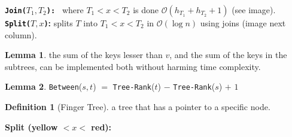 \documentclass[]{article}
\theoremstyle{definition}
\newtheorem{Definition}{\color{defiColor}Definition}
\newtheorem{Lemma}{\color{lemColor}Lemma}
\newcommand\lem   [1] {\begin{Lemma}#1\end{Lemma}}
\newcommand\oc    {\mathcal{O}}
\newcommand\logn      {\log n}
\begin{document}
\begin{multicols}{4}
				\vspace{-2em}
				\textbf{\texttt{Join($T_1, T_2$): }} where $T_1 < x < T_2$ is done $\oc(h_{T_1} + h_{T_2} + 1)$ (see image). \\
				\textbf{\texttt{Split($T, x$)}: }splits $T$ into $T_1 < x < T_2$ in $\oc(\logn)$ using joins (image next column). 
				
				\lem{the sum of the keys lesser than $v$, and the sum of the keys in the subtrees, can be implemented both without harming time complexity. }
				\lem{\texttt{Between}($s, t$) $=$ \texttt{Tree-Rank}($t$) $-$ \texttt{Tree-Rank}($s$) $+$ $1$}
				
				\begin{Definition}[Finger Tree]
					a tree that has a pointer to a specific node. 
				\end{Definition}
				\textbf{Split (yellow $< x < $ red):}
				

\end{multicols}
\end{document}
